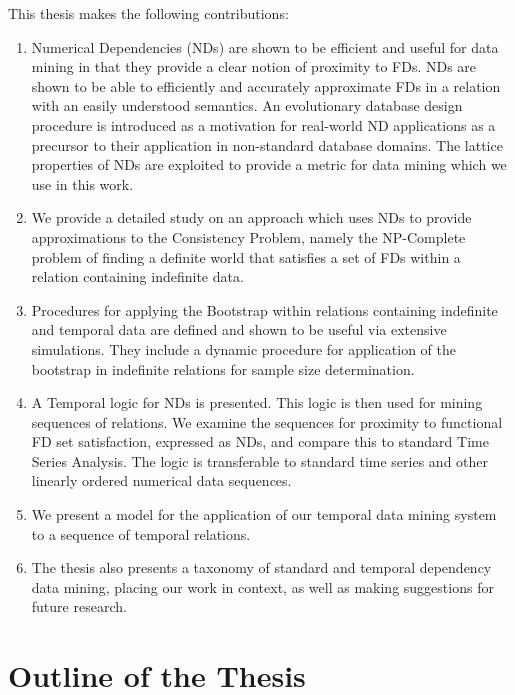 This thesis makes the following contributions:
\begin{enumerate}
\item Numerical Dependencies (NDs) are shown to be efficient and useful for 
data mining in that they provide a clear notion of proximity to FDs.
NDs are shown to be able to efficiently and accurately approximate FDs
in a relation with an easily understood semantics. 
An evolutionary database design procedure is introduced as a 
motivation for real-world ND applications as a precursor to their application
in non-standard database domains. The lattice properties of NDs are
exploited to provide a metric for data mining which we use in this work. 
\item We provide a detailed study on an approach which uses NDs to
provide approximations to the Consistency Problem, namely the
NP-Complete problem of finding a definite world that satisfies a set
of FDs within a relation containing indefinite data. 
\item Procedures for applying the Bootstrap within relations containing
indefinite and temporal data are defined and shown to be useful via extensive
simulations. They include a dynamic procedure for application of the
bootstrap in indefinite relations for sample size determination. 
\item A Temporal logic for NDs is presented. This logic is then used
for mining sequences of relations. We examine the sequences for proximity
to functional FD set satisfaction, expressed as NDs, and compare this
to standard Time Series 
Analysis. The logic is transferable to standard time series and other
linearly ordered numerical data sequences.
\item We present a model for the application of our temporal data
mining system to a sequence of temporal relations.
\item The thesis also presents a taxonomy of standard and temporal 
dependency data mining, 
placing our work in context, as well as making suggestions for future research.
\end{enumerate}




\section{Outline of the Thesis}\label{sec:int_outline}

